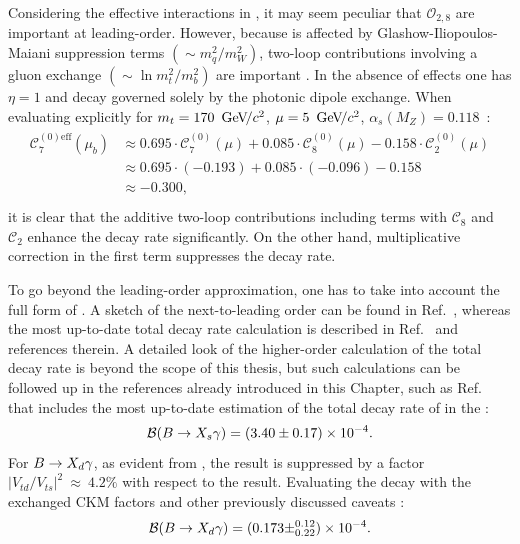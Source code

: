 Considering the effective interactions in , it may seem peculiar that $\mathcal{O}_{2,8}$ are important at leading-order.
However, because \BtoXsgamma is affected by Glashow-Iliopoulos-Maiani suppression terms $(\sim m_q^2/m_W^2)$, two-loop contributions involving a gluon exchange $(\sim\ln m_t^2/m_b^2)$ are important \cite{Bertolini:1986th}.
In the absence of \QCD effects one has $\eta=1$ and \BtoXsgamma decay governed solely by the photonic dipole exchange.
When evaluating  explicitly for $m_t=170~{\mathrm{\,Ge\kern -0.1em V\!/}c^2}$, $\mu=5~{\mathrm{\,Ge\kern -0.1em V\!/}c^2}$, $\alpha_s(M_Z)=0.118$~\cite{Buras:1998raa}:
\begin{align}
    \begin{split}
        \mathcal{C}_7^{(0)\mathrm{eff}}(\mu_b) &\approx 0.695 \cdot \mathcal{C}_7^{(0)}(\mu) + 0.085 \cdot \mathcal{C}_8^{(0)}(\mu) - 0.158 \cdot \mathcal{C}_2^{(0)}(\mu)  \\ 
                          &\approx 0.695 \cdot (-0.193) + 0.085 \cdot (-0.096) - 0.158\\
                          &\approx -0.300, \\
    \end{split}
\end{align}
it is clear that the additive \QCD two-loop contributions including terms with $\mathcal{C}_8$ and $\mathcal{C}_2$ enhance the decay rate significantly.
On the other hand, multiplicative \QCD correction in the first term suppresses the decay rate.

To go beyond the leading-order approximation, one has to take into account the full form of .
A sketch of the next-to-leading order can be found in Ref.~\cite{Gambino:2001ew}, whereas the most up-to-date total decay rate calculation is described in Ref.~\cite{Misiak:2020vlo} and references therein.
A detailed look of the higher-order calculation of the total \BtoXsgamma decay rate is beyond the scope of this thesis, but such calculations can be followed up in the references already introduced in this Chapter, such as Ref.~\cite{Misiak:2020vlo} that includes the most up-to-date estimation of the total decay rate of \BtoXsgamma in the \SM:
\begin{equation}\label{eq:btosgamma_theoretical}
    \mathcal{B}(\BtoXsgamma) = (3.40\pm 0.17) \times 10^{-4}.
\end{equation}
For $\BtoXdgamma$, as evident from , the result is suppressed by a factor $|V_{td}/V_{ts}|^2~\approx~4.2\%$ with respect to the \BtoXsgamma result.
Evaluating the decay with the exchanged CKM factors and other previously discussed caveats \cite{Misiak:2015xwa}:
\begin{equation}\label{eq:btodgamma_theoretical}
    \mathcal{B}(\BtoXdgamma) = (0.173\pm^{0.12}_{0.22}) \times 10^{-4}.
\end{equation}

